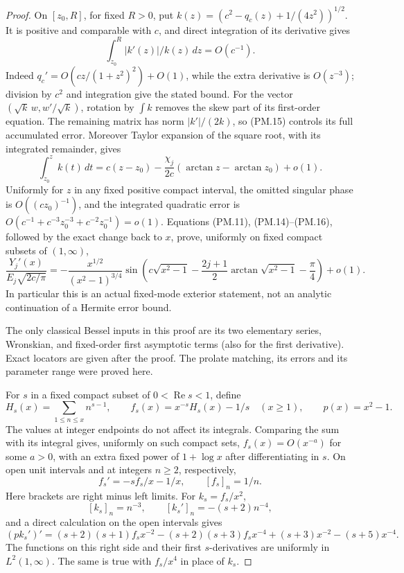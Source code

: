 \begin{proof}
On \([z_0,R]\), for fixed \(R>0\), put
\(k(z)=(c^2-q_c(z)+1/(4z^2))^{1/2}\).
It is positive and comparable with \(c\), and direct integration
of its derivative gives
\[
                  \int_{z_0}^R |k'(z)|/k(z)\,dz=O(c^{-1}).
 \tag{PM.15}
\]
Indeed \(q_c'=O(cz/(1+z^2)^2)+O(1)\), while the extra derivative
is \(O(z^{-3})\); division by \(c^2\) and integration give the
stated bound.  For the vector \((\sqrt k\,w,w'/\sqrt k)\), rotation
by \(\int k\) removes the skew part of its first-order equation.
The remaining matrix has norm \(|k'|/(2k)\), so (PM.15) controls
its full accumulated error.  Moreover Taylor expansion of the square
root, with its integrated remainder, gives
\[
 \int_{z_0}^z k(t)\,dt
  =c(z-z_0)-\frac{\chi_j}{2c}(\arctan z-\arctan z_0)+o(1).
 \tag{PM.16}
\]
Uniformly for \(z\) in any fixed positive compact interval, the
omitted singular phase is \(O((cz_0)^{-1})\), and the integrated
quadratic error is
\(O(c^{-1}+c^{-3}z_0^{-3}+c^{-2}z_0^{-1})=o(1)\).
Equations (PM.11), (PM.14)--(PM.16), followed by the exact change
back to \(x\), prove, uniformly on fixed compact subsets of \((1,\infty)\),
\[
 \frac{Y_j'(x)}{E_j\sqrt{2c/\pi}}
 =-\frac{x^{1/2}}{(x^2-1)^{3/4}}
       \sin\left(c\sqrt{x^2-1}
           -\frac{2j+1}{2}\arctan\sqrt{x^2-1}-\frac\pi4\right)+o(1).
 \tag{PM.17}
\]
In particular this is an actual fixed-mode exterior statement, not an
analytic continuation of a Hermite error bound.

The only classical Bessel inputs in this proof are its two elementary
series, Wronskian, and fixed-order first asymptotic terms (also for the
first derivative).  Exact locators are given after the proof.  The
prolate matching, its errors and its parameter range were proved here.

For \(s\) in a fixed compact subset of \(0<\operatorname{Re}s<1\), define
\[
 H_s(x)=\sum_{1\le n\le x}n^{s-1},\qquad
 f_s(x)=x^{-s}H_s(x)-1/s\quad(x\ge1),\qquad p(x)=x^2-1.
 \tag{PM.18}
\]
The values at integer endpoints do not affect its integrals.  Comparing
the sum with its integral gives, uniformly on such compact sets,
\(f_s(x)=O(x^{-a})\) for some \(a>0\), with an extra fixed power
of \(1+\log x\) after differentiating in \(s\).  On open unit
intervals and at integers \(n\ge2\), respectively,
\[
 f_s'=-s f_s/x-1/x,\qquad [f_s]_n=1/n.
 \tag{PM.19}
\]
Here brackets are right minus left limits.
For \(k_s=f_s/x^2\),
\[
 [k_s]_n=n^{-3},\qquad [k_s']_n=-(s+2)n^{-4},
\]
and a direct calculation on the open intervals gives
\[
 (pk_s')'=
 (s+2)(s+1)f_sx^{-2}-(s+2)(s+3)f_sx^{-4}
             +(s+3)x^{-2}-(s+5)x^{-4}.
 \tag{PM.20}
\]
The functions on this right side and their first \(s\)-derivatives
are uniformly in \(L^2(1,\infty)\).  The same is true with \(f_s/x^4\)
in place of \(k_s\).


\end{proof}
